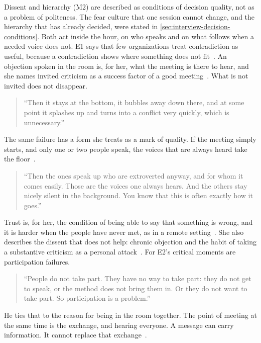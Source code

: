 Dissent and hierarchy (M2) are described as conditions of decision quality, not as a problem
of politeness.
The fear culture that one session cannot change, and the hierarchy that has already decided,
were stated in \autoref{sec:interview-decision-conditions}.
Both act inside the hour, on who speaks and on what follows when a needed voice does not.
E1 says that few organizations treat contradiction as useful, because a contradiction shows
where something does not fit~.
An objection spoken in the room is, for her, what the meeting is there to hear, and she names
invited criticism as a success factor of a good meeting~.
What is not invited does not disappear.
{\setlength{\topsep}{0.25\baselineskip}\setlength{\partopsep}{0pt}%
  \begin{quote}\small
    \enquote{Then it stays at the bottom, it bubbles away down there, and at some point it
      splashes up and turns into a conflict very quickly, which is
    unnecessary.}~
\end{quote}}
The same failure has a form she treats as a mark of quality.
If the meeting simply starts, and only one or two people speak, the voices that are always
heard take the floor~.
{\setlength{\topsep}{0.25\baselineskip}\setlength{\partopsep}{0pt}%
  \begin{quote}\small
    \enquote{Then the ones speak up who are extroverted anyway, and for whom it comes easily.
      Those are the voices one always hears. And the others stay nicely silent in the background.
    You know that this is often exactly how it goes.}~
\end{quote}}
Trust is, for her, the condition of being able to say that something is wrong, and it is
harder when the people have never met, as in a remote setting~.
She also describes the dissent that does not help: chronic objection and the habit of taking a substantive
criticism as a personal attack~.
For E2's critical moments are participation failures.
{\setlength{\topsep}{0.25\baselineskip}\setlength{\partopsep}{0pt}%
  \begin{quote}\small
    \enquote{People do not take part. They have no way to take part: they do not get to speak,
      or the method does not bring them in. Or they do not want to take part. So participation
    is a problem.}~
\end{quote}}

He ties that to the reason for being in the room together.
The point of meeting at the same time is the exchange, and hearing everyone.
A message can carry information. It cannot replace that exchange~.

